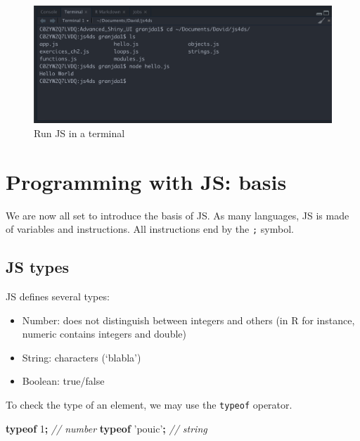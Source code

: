 \documentclass[]{book}
\newenvironment{Shaded}{\begin{snugshade}}{\end{snugshade}}
\newcommand{\CommentTok}[1]{\textcolor[rgb]{0.56,0.35,0.01}{\textit{#1}}}
\newcommand{\DecValTok}[1]{\textcolor[rgb]{0.00,0.00,0.81}{#1}}
\newcommand{\KeywordTok}[1]{\textcolor[rgb]{0.13,0.29,0.53}{\textbf{#1}}}
\newcommand{\OperatorTok}[1]{\textcolor[rgb]{0.81,0.36,0.00}{\textbf{#1}}}
\newcommand{\StringTok}[1]{\textcolor[rgb]{0.31,0.60,0.02}{#1}}
\providecommand{\tightlist}{%
  \setlength{\itemsep}{0pt}\setlength{\parskip}{0pt}}
\begin{document}
\begin{figure}
\includegraphics[width=26.75in]{images/survival-kit/script-rstudio} \caption{Run JS in a terminal}\label{fig:script-rstudio}
\end{figure}

\hypertarget{programming-with-js-basis}{%
\section{Programming with JS: basis}\label{programming-with-js-basis}}

We are now all set to introduce the basis of JS. As many languages, JS is made of variables and instructions. All instructions end by the \texttt{;} symbol.

\hypertarget{js-types}{%
\subsection{JS types}\label{js-types}}

JS defines several types:

\begin{itemize}
\tightlist
\item
  Number: does not distinguish between integers and others (in R for instance, numeric contains integers and double)
\item
  String: characters (`blabla')
\item
  Boolean: true/false
\end{itemize}

To check the type of an element, we may use the \texttt{typeof} operator.

\begin{Shaded}
\begin{Highlighting}[]
\KeywordTok{typeof} \DecValTok{1}\OperatorTok{;} \CommentTok{// number}
\KeywordTok{typeof} \StringTok{'pouic'}\OperatorTok{;} \CommentTok{// string}
\end{Highlighting}
\end{Shaded}
\end{document}
